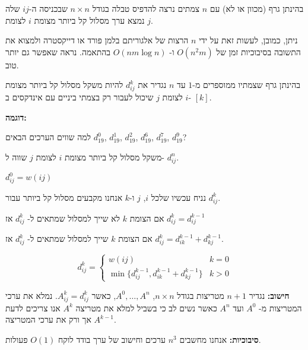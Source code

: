 בהינתן גרף (מכוון או לא) עם $n$ צמתים נרצה להדפיס טבלה בגודל 
$n \times n$ 
שבכניסה ה-$ij$ שלה נמצא ערך מסלול קל ביותר מצומת 
$i$
לצומת 
$j$.

ניתן, כמובן, לעשות זאת על ידי $n$ הרצות של אלגוריתם בלמן פורד או דייקסטרה ולמצוא את התשובה 
בסיבוכיות זמן של 
$O(n^2 m)$
ו-
$O(n m \log n)$
בהתאמה.
נראה שאפשר גם יותר טוב.

בהינתן גרף שצמתיו ממוספרים מ-$1$ עד $n$ נגדיר את 
$d_{ij}^k$
להיות משקל מסלול קל ביותר מצומת $i$ לצומת $j$ שיכול לעבור רק בצמתי ביניים עם אינדקסים ב-%
$[k]$.

\textbf{דוגמה:}
\begin{center}
\end{center}

למה שווים הערכים הבאים
$d_{19}^0$, $d_{19}^1$, $d_{19}^2$, $d_{19}^6$, $d_{19}^7$, $d_{19}^9$?

\begin{observation}
משקל מסלול קל ביותר מצומת $i$ לצומת $j$ שווה ל-%
$d_{ij}^n$.
\end{observation}

\begin{observation}
$d_{ij}^0 = w(ij)$
\end{observation}

נניח עכשיו שלכל $i$, $j$ ו-$k$ אנחנו מקבעים מסלול קל ביותר עבור
$d_{ij}^k$.

\begin{observation}
אם הצומת $k$ לא שייך למסלול שמתאים ל-%
$d_{ij}^k$
אז
$d_{ij}^k = d_{ij}^{k - 1}$
\end{observation}

\begin{observation}
אם הצומת $k$ שייך למסלול שמתאים ל-%
$d_{ij}^k$
אז
$d_{ij}^k = d_{ik}^{k - 1} + d_{kj}^{k - 1}$.
\end{observation}

\begin{corollary}
$$
d_{ij}^{k} = 
\begin{cases}
w(ij)														& k = 0
\\
\min\{d_{ij}^{k - 1}, d_{ik}^{k - 1} + d_{kj}^{k - 1}\}		& k > 0
\end{cases}
$$
\end{corollary}

\textbf{חישוב:}
נגדיר 
$n + 1$ 
מטריצות בגודל 
$n \times n$, $A^0, \ldots, A^n$, 
כאשר 
$A_{ij}^k = d_{ij}^k$.
נמלא את ערכי המטריצות מ-%
$A^0$
ועד
$A^n$
כאשר נשים לב כי בשביל למלא את מטריצה 
$A^k$
אנו צריכים לדעת אך ורק את ערכי המטריצה 
$A^{k - 1}$.

\textbf{סיבוכיות:}
אנחנו מחשבים 
$n^3$
ערכים וחישוב של ערך בודד לוקח 
$O(1)$ 
פעולות.
